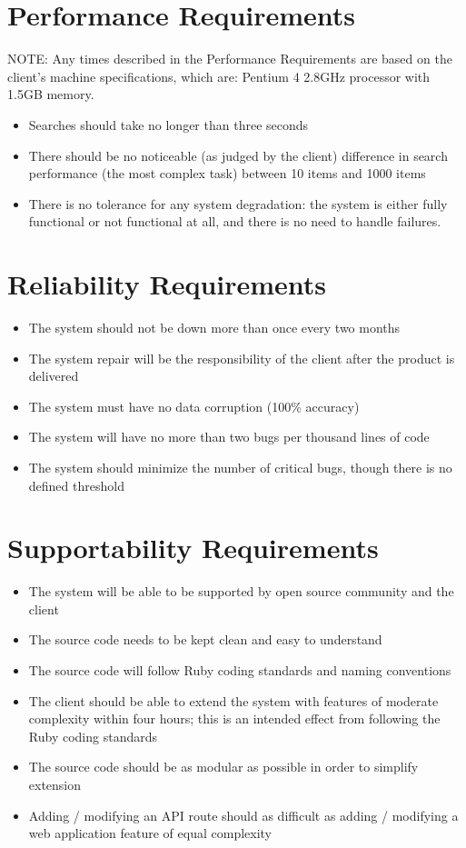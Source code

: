 \documentclass{article}
\begin{document}
\section{Performance Requirements}
\label{performance}
NOTE: Any times described in the Performance Requirements are based on the client's machine specifications, which are: Pentium 4 2.8GHz processor with 1.5GB memory.
\begin{itemize}
\item Searches should take no longer than three seconds
\item There should be no noticeable (as judged by the client) difference in search performance (the most complex task) between 10 items and 1000 items
\item There is no tolerance for any system degradation: the system is either fully functional or not functional at all, and there is no need to handle failures.\label{degrad_sys}
\end{itemize}

\section{Reliability Requirements}
\label{reliability}
\begin{itemize}
\item The system should not be down more than once every two months
\item The system repair will be the responsibility of the client after the product is delivered
\item The system must have no data corruption (100\% accuracy)\label{data_corruption}
\item The system will have no more than two bugs per thousand lines of code\label{bug}
\item The system should minimize the number of critical bugs, though there is no defined threshold
\end{itemize}

\section{Supportability Requirements}
\label{support}
\begin{itemize}
\item The system will be able to be supported by open source community and the client
\item The source code needs to be kept clean and easy to understand
\item The source code will follow Ruby coding standards and naming conventions
\item The client should be able to extend the system with features of moderate complexity within four hours; this is an intended effect from following the Ruby coding standards
\item The source code should be as modular as possible in order to simplify extension
\item Adding / modifying an API route should as difficult as adding / modifying a web application feature of equal complexity
\end{itemize}
\end{document}
